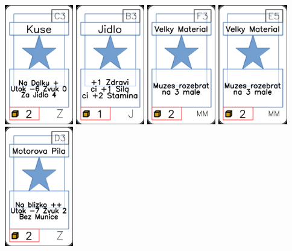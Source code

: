 \documentclass[a4paper]{article}
\begin{document}
	\includegraphics[width=3.0cm]{img-1_102}
	\includegraphics[width=3.0cm]{img-1_7}
	\includegraphics[width=3.0cm]{img-1_57}
	\includegraphics[width=3.0cm]{img-1_54}
	\includegraphics[width=3.0cm]{img-1_107}
\end{document}

